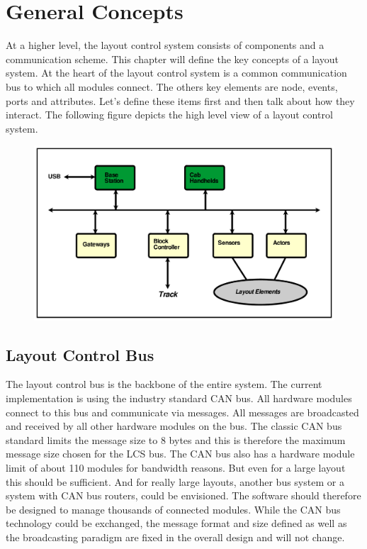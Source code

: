 %
%
%
\chapter{General Concepts}

At a higher level, the layout control system consists of components and a communication scheme. This chapter will define the key concepts of a layout system. At the heart of the layout control system is a common communication bus to which all modules connect. The others key elements are node, events, ports and attributes. Let's define these items first and then talk about how they interact. The following figure depicts the high level view of a layout control system.

\begin{figure}[h]
    \centering
    \includegraphics[page=1, width=\textwidth]{./figures/Schematic_LcsNodes-Layout-Overview.pdf}
\end{figure}

\section{Layout Control Bus}

The layout control bus is the backbone of the entire system. The current implementation is using the industry standard CAN bus. All hardware modules connect to this bus and communicate via messages. All messages are broadcasted and received by all other hardware modules on the bus. The classic CAN bus standard limits the message size to 8 bytes and this is therefore the maximum message size chosen for the LCS bus. The CAN bus also has a hardware module limit of about 110 modules for bandwidth reasons. But even for a large layout this should be sufficient. And for really large layouts, another bus system or a system with CAN bus routers, could be envisioned. The software should therefore be designed to manage thousands of connected modules. While the CAN bus technology could be exchanged, the message format and size defined as well as the broadcasting paradigm are fixed in the overall design and will not change.

